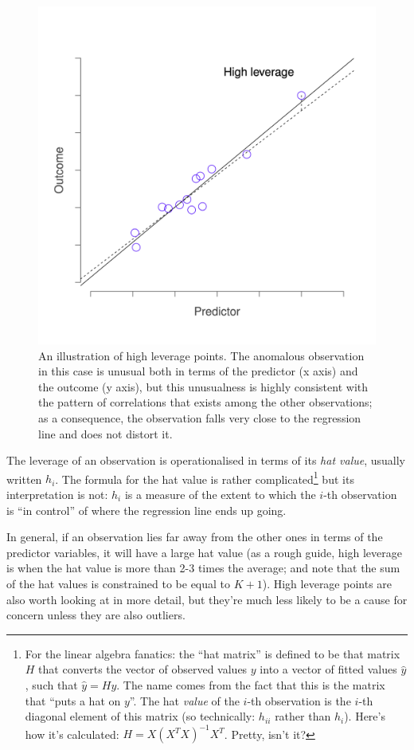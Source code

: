 \documentclass[
]{book}
\theoremstyle{definition}
\theoremstyle{definition}
\theoremstyle{definition}
\theoremstyle{definition}
\theoremstyle{remark}
\begin{document}
\begin{figure}

{\centering \includegraphics[width=0.66\linewidth]{resources/image/unusual_leverage} 

}

\caption{An illustration of high leverage points. The anomalous observation in this case is unusual both in terms of the predictor (x axis) and the outcome (y axis), but this unusualness is highly consistent with the pattern of correlations that exists among the other observations; as a consequence, the observation falls very close to the regression line and does not distort it.}\label{fig:leverage}
\end{figure}

The leverage of an observation is operationalised in terms of its \emph{hat value}, usually written \(h_i\). The formula for the hat value is rather complicated\footnote{For the linear algebra fanatics: the ``hat matrix'' is defined to be that matrix \(H\) that converts the vector of observed values \(y\) into a vector of fitted values \(\hat{y}\), such that \(\hat{y} = H y\). The name comes from the fact that this is the matrix that ``puts a hat on \(y\)''. The hat \emph{value} of the \(i\)-th observation is the \(i\)-th diagonal element of this matrix (so technically: \(h_{ii}\) rather than \(h_{i}\)). Here's how it's calculated: \(H = X(X^TX)^{-1} X^T\). Pretty, isn't it?} but its interpretation is not: \(h_i\) is a measure of the extent to which the \(i\)-th observation is ``in control'' of where the regression line ends up going.

In general, if an observation lies far away from the other ones in terms of the predictor variables, it will have a large hat value (as a rough guide, high leverage is when the hat value is more than 2-3 times the average; and note that the sum of the hat values is constrained to be equal to \(K+1\)). High leverage points are also worth looking at in more detail, but they're much less likely to be a cause for concern unless they are also outliers.
\end{document}
